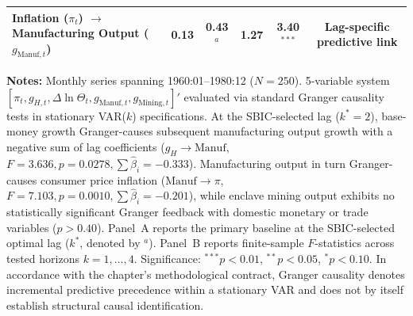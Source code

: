 \begin{table}[htbp]
{\begin{tabular}{llccccc}
Inflation ($\pi_t$) $\to$ Manufacturing Output ($g_{\text{Manuf},t}$) & 0.13 & 0.43$^a$ & 1.27 & 3.40$^{***}$ & \multicolumn{2}{c}{Lag-specific predictive link} \\
\bottomrule
\end{tabular}%
}
\begin{minipage}{0.96\textwidth}
\vspace{0.3em}
\footnotesize \textbf{Notes:} Monthly series spanning 1960:01--1980:12 ($N=250$). 5-variable system $[\pi_t, g_{H,t}, \Delta \ln \Theta_t, g_{\text{Manuf},t}, g_{\text{Mining},t}]'$ evaluated via standard Granger causality tests in stationary VAR($k$) specifications. At the SBIC-selected lag ($k^*=2$), base-money growth Granger-causes subsequent manufacturing output growth with a negative sum of lag coefficients ($g_H \to \text{Manuf}$, $F = 3.636, p = 0.0278, \sum \hat{\beta}_i = -0.333$). Manufacturing output in turn Granger-causes consumer price inflation ($\text{Manuf} \to \pi$, $F = 7.103, p = 0.0010, \sum \hat{\beta}_i = -0.201$), while enclave mining output exhibits no statistically significant Granger feedback with domestic monetary or trade variables ($p > 0.40$). Panel~A reports the primary baseline at the SBIC-selected optimal lag ($k^*$, denoted by $^a$). Panel~B reports finite-sample $F$-statistics across tested horizons $k = 1, \dots, 4$. Significance: $^{***} p < 0.01$, $^{**} p < 0.05$, $^{*} p < 0.10$. In accordance with the chapter's methodological contract, Granger causality denotes incremental predictive precedence within a stationary VAR and does not by itself establish structural causal identification.
\end{minipage}
\end{table}
